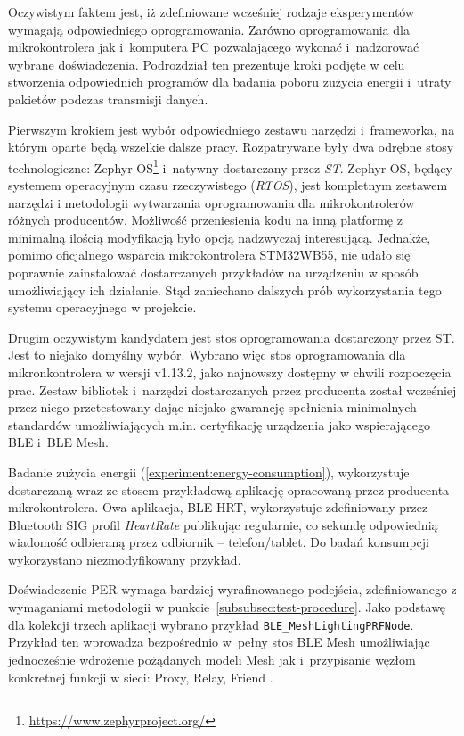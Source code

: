 Oczywistym faktem jest, iż zdefiniowane wcześniej rodzaje eksperymentów wymagają
odpowiedniego oprogramowania. Zarówno oprogramowania dla mikrokontrolera
jak i~komputera PC pozwalającego wykonać i~nadzorować wybrane doświadczenia.
Podrozdział ten prezentuje kroki podjęte w celu stworzenia odpowiednich
programów dla badania poboru zużycia energii i~utraty pakietów podczas
transmisji danych.

Pierwszym krokiem jest wybór odpowiedniego zestawu narzędzi i~frameworka,
na którym oparte będą wszelkie dalsze pracy. Rozpatrywane były dwa odrębne
stosy technologiczne: Zephyr OS\footnote{\url{https://www.zephyrproject.org/}} i~natywny dostarczany przez \textit{ST}.
Zephyr OS, będący systemem operacyjnym czasu rzeczywistego (\textit{RTOS}), jest kompletnym zestawem
narzędzi i metodologii wytwarzania oprogramowania dla mikrokontrolerów różnych producentów. Możliwość
przeniesienia kodu na inną platformę z minimalną ilością modyfikacją było opcją nadzwyczaj interesującą.
Jednakże, pomimo oficjalnego wsparcia mikrokontrolera STM32WB55, nie udało się poprawnie
zainstalować dostarczanych przykładów na urządzeniu w sposób umożliwiający ich działanie. Stąd zaniechano
dalszych prób wykorzystania tego systemu operacyjnego w projekcie.

Drugim oczywistym kandydatem jest stos oprogramowania dostarczony przez ST. Jest to niejako
domyślny wybór. Wybrano więc stos oprogramowania dla mikronkontrolera w wersji v1.13.2, jako
najnowszy dostępny w chwili rozpoczęcia prac. Zestaw bibliotek i~narzędzi dostarczanych
przez producenta został wcześniej przez niego przetestowany dając niejako gwarancję spełnienia 
minimalnych standardów umożliwiających m.in. certyfikację urządzenia jako wspierającego
BLE i~BLE Mesh.

Badanie zużycia energii (\ref{experiment:energy-consumption}), wykorzystuje dostarczaną wraz ze stosem przykładową aplikację 
opracowaną przez producenta mikrokontrolera. Owa aplikacja, BLE \gls{HRT}, wykorzystuje zdefiniowany
przez Bluetooth SIG profil \textit{HeartRate} publikując regularnie, co sekundę
odpowiednią wiadomość odbieraną przez odbiornik -- telefon/tablet. Do badań
konsumpcji wykorzystano niezmodyfikowany przykład.

Doświadczenie \gls{PER} wymaga bardziej wyrafinowanego podejścia, zdefiniowanego z wymaganiami
metodologii w punkcie~\ref{subsubsec:test-procedure}. Jako podstawę dla kolekcji trzech aplikacji
wybrano przykład \texttt{BLE\_MeshLightingPRFNode}. Przykład ten wprowadza bezpośrednio
w~pełny stos BLE Mesh umożliwiając jednocześnie wdrożenie pożądanych modeli Mesh jak
i~przypisanie węzłom konkretnej funkcji w sieci: Proxy, Relay, Friend \cite{st_an5292_2021}.

